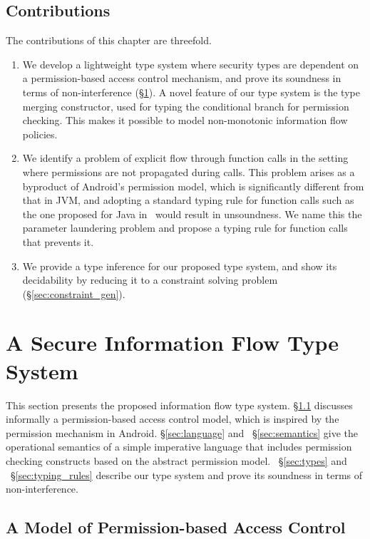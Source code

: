 \subsection{Contributions}
The contributions of this chapter are threefold.
\begin{enumerate}\item We develop a lightweight type system where security types are dependent on a permission-based access control mechanism, and prove its soundness in terms of non-interference (\S\ref{sec:type_system}). A novel feature of our type system is the type merging constructor, used for typing the conditional branch for permission checking. This makes it possible to model non-monotonic information flow policies.
	\item We identify a problem of explicit flow through function calls in the setting where permissions are not propagated during calls. This problem
	arises as a byproduct of Android's permission model, which is significantly different from that in JVM, and adopting a standard typing rule for function calls such as the one proposed for Java in~\cite{Banerjee:2005ht} 
	would result in unsoundness. We name this the parameter laundering problem and propose a typing rule for function calls that prevents it.
	\item We provide a type inference for our proposed type system, and show its decidability by reducing it to a constraint solving problem (\S\ref{sec:constraint_gen}).
\end{enumerate}
 \section{A Secure Information Flow Type System}\label{sec:type_system}

This section presents the proposed information flow type system. \S\ref{sec:permission_model} discusses informally a permission-based access control model, which is inspired by the permission mechanism in Android.
 \S\ref{sec:language} and ~\S\ref{sec:semantics} give the operational semantics of a simple imperative language that includes permission checking
constructs based on the abstract permission model.
~\S\ref{sec:types} and ~\S\ref{sec:typing_rules} describe our type system and prove its soundness in terms of non-interference.

\subsection{A Model of Permission-based Access Control}
\label{sec:permission_model}

